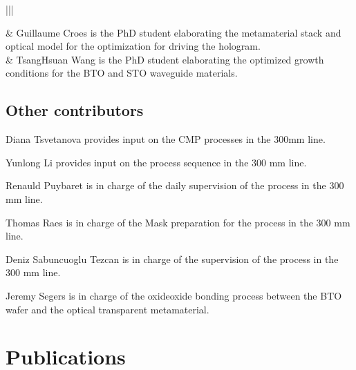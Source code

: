 \documentclass[a4paper,10pt,english,openany,oneside]{jupyterBook}
\begin{document}
\begin{savenotes}\sphinxattablestart
\centering
{}
\sphinxthecaptionisattop
{}\label{\detokenize{Team:id1}}
\sphinxaftertopcaption
\begin{tabular}[t]{|||}
\hline

\sphinxAtStartPar
{}
&
\sphinxAtStartPar
Guillaume Croes is the PhD student elaborating the metamaterial stack and optical model for the optimization for driving the hologram.
\\
\hline
\sphinxAtStartPar
{}
&
\sphinxAtStartPar
Tsang\sphinxhyphen{}Hsuan Wang is the PhD student elaborating the optimized growth conditions for the BTO and STO waveguide materials.
\\
\hline
\end{tabular}
\par
\sphinxattableend\end{savenotes}


\section{Other contributors}
\label{\detokenize{Team:other-contributors}}
\sphinxAtStartPar
Diana Tsvetanova provides input on the CMP processes in the 300mm line.

\sphinxAtStartPar
Yunlong Li provides input on the process sequence in the 300 mm line.

\sphinxAtStartPar
Renauld Puybaret is in charge of the daily supervision of the process in the 300 mm line.

\sphinxAtStartPar
Thomas Raes is in charge of the Mask preparation for the process in the 300 mm line.

\sphinxAtStartPar
Deniz Sabuncuoglu Tezcan is in charge of the supervision of the process in the 300 mm line.

\sphinxAtStartPar
Jeremy Segers is in charge of the oxide\sphinxhyphen{}oxide bonding process between the BTO wafer and the optical transparent metamaterial.

\sphinxstepscope


\chapter{Publications}
\label{\detokenize{Publications:publications}}\label{\detokenize{Publications::doc}}
\end{document}
